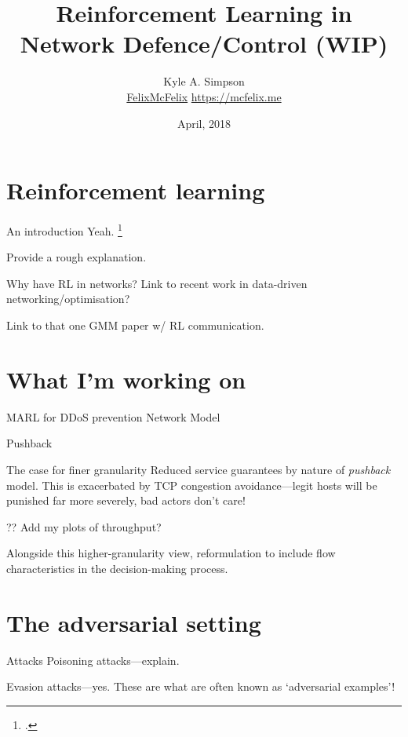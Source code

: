 \documentclass[aspectratio=169,xcolor={dvipsnames}
,hide notes
]{beamer}
\title{Reinforcement Learning in Network Defence/Control (WIP)}
\author{Kyle A. Simpson\\
	\tiny{\faGithub{} \href{https://github.com/felixmcfelix}{FelixMcFelix} \hspace{0.5em} \faGlobe{} \url{https://mcfelix.me}}}
\institute{University of Glasgow}
\date{\nth{10} April, 2018}
\begin{document}
\maketitle

\section{Reinforcement learning}

\begin{frame}{An introduction}
	Yeah. \footcite{RL2E}
	
	Provide a rough explanation.
\end{frame}

\begin{frame}{Why have RL in networks?}
	Link to recent work in data-driven networking/optimisation?
	
	Link to that one GMM paper w/ RL communication.
\end{frame}

\section{What I'm working on}

\begin{frame}{MARL for DDoS prevention}
	Network Model
	
	Pushback
\end{frame}

\begin{frame}{The case for finer granularity}
	Reduced service guarantees by nature of \emph{pushback} model.
	This is exacerbated by TCP congestion avoidance---legit hosts will be punished far more severely, bad actors don't care!
	
	?? Add my plots of throughput?
	
	Alongside this higher-granularity view, reformulation to include flow characteristics in the decision-making process.
\end{frame}

\section{The adversarial setting}

\begin{frame}{Attacks}
	Poisoning attacks---explain.
	
	Evasion attacks---yes. These are what are often known as `adversarial examples'!
\end{frame}
\end{document}
